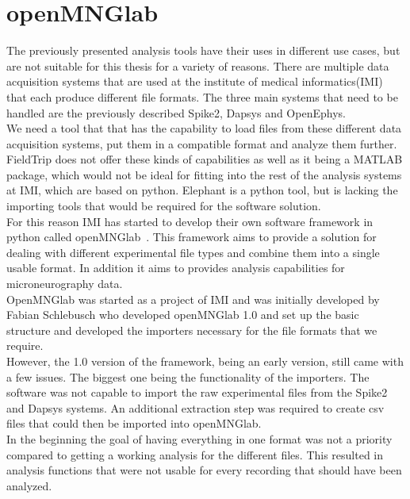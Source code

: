 \section{openMNGlab}
The previously presented analysis tools have their uses in different use cases, but are not suitable for this thesis for a variety of reasons.
There are multiple data acquisition systems that are used at the institute of medical informatics(IMI) that each produce different file formats. The three main systems that need to be handled are the previously described Spike2, Dapsys and OpenEphys. \\ 
We need a tool that that has the capability to load files from these different data acquisition systems, put them in a compatible format and analyze them further.  FieldTrip does not offer these kinds of capabilities as well as it being a MATLAB package, which would not be ideal for fitting into the rest of the analysis systems at IMI, which are based on python. Elephant is a python tool, but is lacking the importing tools that would be required for the software solution.  \\
For this reason IMI has started to develop their own software framework in python called openMNGlab~\cite{schlebusch_openmnglab_2021}.  This framework aims to provide a solution for dealing with different experimental file types and combine them into a single usable format.  In addition it aims to provides analysis capabilities for microneurography data. \\
OpenMNGlab was started as a project of IMI and was initially developed by Fabian Schlebusch who developed openMNGlab 1.0 and set up the basic structure and developed the importers necessary for the file formats that we require. \\
However, the 1.0 version of the framework, being an early version,  still came with a few issues. The biggest one being the functionality of the importers. The software was not capable to import the raw experimental files from the Spike2 and Dapsys systems. An additional extraction step was required to create csv files that could then be imported into openMNGlab. \\
In the beginning the goal of having everything in one format was not a priority compared to getting a working analysis for the different files. This resulted in analysis functions that were not usable for every recording that should have been analyzed.\\

